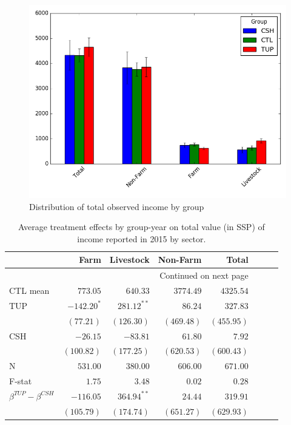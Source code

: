\documentclass[12pt,article]{article}
\begin{document}
\newpage
\begin{figure}[htb]
\centering
\includegraphics[width=.9\linewidth]{../figures/Income_group.png}
\caption{\label{fig:Income_group}Distribution of total observed income by group}
\end{figure} 

\begin{longtable}{lrrrrrrr}
\caption{\label{tab:Income}Average treatment effects by group-year on total value (in SSP) of income reported in 2015 by sector.}
\\
\hline
 & Farm & Livestock & Non-Farm & Total\\
\hline
\endhead
\hline\multicolumn{5}{r}{Continued on next page} \\
\endfoot
\endlastfoot
CTL mean & $773.05$ & $640.33$ & $3774.49$ & $4325.54$\\
\hline
TUP & $-142.20^{*}$ & $281.12^{**}$ & $86.24$ & $327.83$\\
 & $(77.21)$ & $(126.30)$ & $(469.48)$ & $(455.95)$\\
CSH & $-26.15$ & $-83.81$ & $61.80$ & $7.92$\\
 & $(100.82)$ & $(177.25)$ & $(620.53)$ & $(600.43)$\\
\hline
N & $531.00$ & $380.00$ & $606.00$ & $671.00$\\
F-stat & $1.75$ & $3.48$ & $0.02$ & $0.28$\\
\hline
$\beta^{TUP}-\beta^{CSH}$ & $-116.05$ & $364.94^{**}$ & $24.44$ & $319.91$\\
 & $(105.79)$ & $(174.74)$ & $(651.27)$ & $(629.93)$\\
\hline
\end{longtable}
\end{document}
